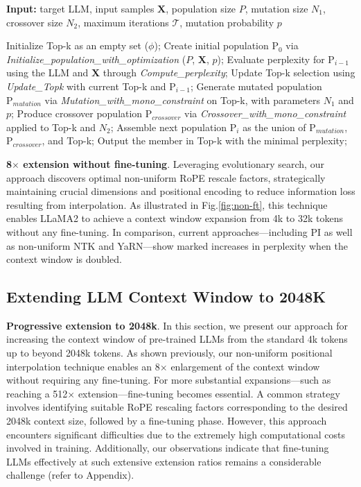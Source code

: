 \begin{algorithm}[t]
	\small
	\caption{The search algorithm}
	\textbf{Input:} target LLM, input samples $\mathbf{X}$, population size $P$, mutation size $N_1$, crossover size $N_2$, maximum iterations $\mathcal{T}$, mutation probability $p$\\

	\begin{algorithmic}[1]
		\label{alg:search}
		\STATE Initialize Top-k as an empty set ($\phi$);	
		\STATE Create initial population $\text{P}_0$ via \textit{Initialize\_population\_with\_optimization} ($P$, $\mathbf{X}$, $p$); 
		\STATE Evaluate perplexity for $\text{P}_{i-1}$ using the LLM and $\mathbf{X}$ through \textit{Compute\_perplexity};
		\STATE Update Top-k selection using \textit{Update\_Topk} with current Top-k and $\text{P}_{i-1}$;
		\STATE Generate mutated population $\text{P}_{mutation}$ via \textit{Mutation\_with\_mono\_constraint} on Top-k, with parameters $N_1$ and $p$;
		\STATE Produce crossover population $\text{P}_{crossover}$ via \textit{Crossover\_with\_mono\_constraint} applied to Top-k and $N_2$;
		\STATE Assemble next population $\text{P}_i$ as the union of $\text{P}_{mutation}$, $\text{P}_{crossover}$, and Top-k;
		\ENDFOR
		\STATE Output the member in Top-k with the minimal perplexity;
	\end{algorithmic}
\end{algorithm}

\textbf{8$\times$ extension without fine-tuning}. Leveraging evolutionary search, our approach discovers optimal non-uniform RoPE rescale factors, strategically maintaining crucial dimensions and positional encoding to reduce information loss resulting from interpolation. As illustrated in Fig.\ref{fig:non-ft}, this technique enables LLaMA2 to achieve a context window expansion from 4k to 32k tokens without any fine-tuning. In comparison, current approaches—including PI as well as non-uniform NTK and YaRN—show marked increases in perplexity when the context window is doubled.

\subsection{Extending LLM Context Window to 2048K}
\label{sec:extendto2048k}

\textbf{Progressive extension to 2048k}. In this section, we present our approach for increasing the context window of pre-trained LLMs from the standard 4k tokens up to beyond 2048k tokens. As shown previously, our non-uniform positional interpolation technique enables an 8$\times$ enlargement of the context window without requiring any fine-tuning. For more substantial expansions—such as reaching a 512$\times$ extension—fine-tuning becomes essential. A common strategy involves identifying suitable RoPE rescaling factors corresponding to the desired 2048k context size, followed by a fine-tuning phase. However, this approach encounters significant difficulties due to the extremely high computational costs involved in training. Additionally, our observations indicate that fine-tuning LLMs effectively at such extensive extension ratios remains a considerable challenge (refer to Appendix).

